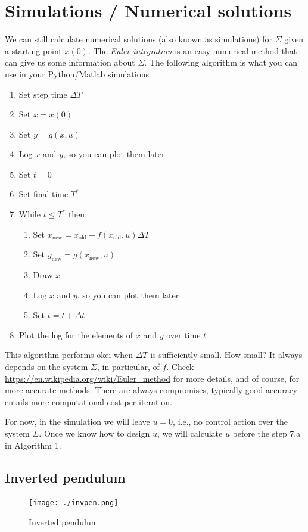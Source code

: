 \section{Simulations / Numerical solutions}
We can still calculate numerical solutions (also known as simulations) for $\Sigma$ given a starting point $x(0)$. The \emph{Euler integration} is an easy numerical method that can give us some information about $\Sigma$. The following algorithm is what you can use in your Python/Matlab simulations
\begin{algo}
	\begin{enumerate}
		\item Set step time $\Delta T$
		\item Set $x = x(0)$
		\item Set $y = g(x,u)$
		\item Log $x$ and $y$, so you can plot them later
		\item Set $t = 0$
		\item Set final time $T^*$
		\item While $t \leq T^*$ then:
			\begin{enumerate}
				\item Set $x_{\text{new}} = x_{\text{old}} + f(x_{\text{old}},u)\Delta T$
				\item Set $y_{\text{new}} = g(x_{\text{new}},u)$
				\item Draw $x$
				\item Log $x$ and $y$, so you can plot them later
				\item Set $t = t + \Delta t$
			\end{enumerate}
		\item Plot the log for the elements of $x$ and $y$ over time $t$
	\end{enumerate}
\end{algo}
This algorithm performs okei when $\Delta T$ is sufficiently small. How small? It always depends on the system $\Sigma$, in particular, of $f$. Check \url{https://en.wikipedia.org/wiki/Euler_method} for more details, and of course, for more accurate methods. There are always compromises, typically good accuracy entails more computational cost per iteration.

For now, in the simulation we will leave $u = 0$, i.e., no control action over the system $\Sigma$. Once we know how to design $u$, we will calculate $u$ before the step 7.a in Algorithm 1.

\subsection{Inverted pendulum}
\begin{figure}[!h]
\centering
	\texttt{[image: ./invpen.png]}
	\caption{Inverted pendulum}
	\label{fig: invpen}
\end{figure}

